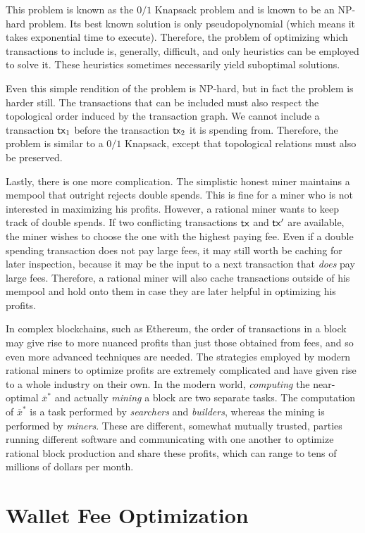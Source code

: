 This problem is known as the $0/1$ Knapsack problem and is known to be an NP-hard problem.
Its best known solution is only pseudopolynomial (which means it takes exponential time to
execute). Therefore, the problem of optimizing
which transactions to include is, generally, difficult, and only heuristics can be employed
to solve it. These heuristics sometimes necessarily yield suboptimal solutions.

Even this simple rendition of the problem is NP-hard, but in fact the problem is harder still.
The transactions that can be included must also respect the topological order induced by
the transaction graph. We cannot include a transaction $\mathsf{tx}_1$ before the transaction $\mathsf{tx}_2$
it is spending from. Therefore, the problem is similar to a $0/1$ Knapsack, except that
topological relations must also be preserved.

Lastly, there is one more complication. The simplistic honest miner maintains a mempool
that outright rejects double spends. This is fine for a miner who is not interested in
maximizing his profits. However, a rational miner wants to keep track of double spends.
If two conflicting transactions $\mathsf{tx}$ and $\mathsf{tx}'$ are available, the miner wishes to
choose the one with the highest paying fee. Even if a double spending transaction does
not pay large fees, it may still worth be caching for later inspection, because it may
be the input to a next transaction that \emph{does} pay large fees. Therefore, a rational
miner will also cache transactions outside of his mempool and hold onto them in case
they are later helpful in optimizing his profits.

In complex blockchains, such as Ethereum, the order of transactions in a block may give rise
to more nuanced profits than just those obtained from fees, and so even more advanced techniques
are needed. The strategies employed by modern rational miners to optimize profits are extremely
complicated and have given rise to a whole industry on their own. In the modern world,
\emph{computing} the near-optimal $\overline{x}^*$ and actually \emph{mining} a block
are two separate tasks. The computation of $\overline{x}^*$ is a task performed by
\emph{searchers} and \emph{builders}, whereas the mining is performed by \emph{miners}.
These are different, somewhat mutually trusted, parties running different software and
communicating with one another to optimize rational block production and share these
profits, which can range to tens of millions of dollars per month.

\section{Wallet Fee Optimization}

